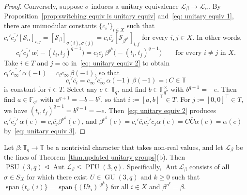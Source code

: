\begin{proof}
Conversely, suppose $\sigma$ induces a unitary equivalence $\mathscr{L}_\beta \to \mathscr{L}_\alpha$.
By Proposition~\ref{prop:switching equiv is unitary equiv} and~\eqref{eq: unitary equiv 1}, there are unimodular constants $\{c_i' \}_{i \in X}$ such that $c_i' \overline{c_j'} [ \mathcal{S}_{\alpha} ]_{i,j} = [ \mathcal{S}_{\beta} ]_{\sigma(i), \sigma(j)} = c_i \overline{c_j} [ \mathcal{S}_{\beta^{p^k}} ]_{i,j}$ for every $i,j \in X$.
In other words,
\begin{equation}
\label{eq: unitary equiv 2}
c_i' \overline{c_j'} \, \alpha \bigl( - (t_i,t_j)^{q-1} \bigr) = c_i \overline{c_j} \, \beta^{p^k}\bigl( - (t_i, t_j)^{q-1} \bigr)
\qquad
\text{for every $i \neq j$ in $X$}.
\end{equation}
Take $i \in T$ and $j = \infty$ in~\eqref{eq: unitary equiv 2} to obtain $c_i' \overline{ c_\infty' }\, \alpha(-1) = c_i \overline{c_\infty}\, \beta(-1)$, so that
\begin{equation}
\label{eq: unitary equiv 3}
c_i' \overline{c_i} = c_{\infty}' \overline{ c_\infty } \, \alpha(-1)\, \beta(-1) =: C \in \mathbb{T}
\end{equation}
is constant for $i \in T$.
Select any $e \in \mathbb{T}_q$, and find $b \in \mathbb{F}_{q^2}^\times$ with $b^{q-1} = -e$.
Then find $a \in \mathbb{F}_{q^2}$ with $a^{q+1} = -b-b^q$, so that $i:=[a,b]^\top \in T$.
For $j := [0,0]^\top \in T$, we have $(t_i,t_j)^{q-1} = b^{q-1} = -e$.
Then~\eqref{eq: unitary equiv 2} produces $c_i' \overline{c_j'} \, \alpha(e) = c_i \overline{c_j} \beta^{p^k}(e)$, and $\beta^{p^k}(e) = c_i' \overline{c_i} \overline{c_j'} c_j \alpha(e) = C \overline{C} \alpha(e) = \alpha(e)$ by~\eqref{eq: unitary equiv 3}.
\end{proof}

\begin{theorem}
\label{thm:unitary automorphisms}
Let $\beta \colon \mathbb{T}_q \to \mathbb{T}$ be a nontrivial character that takes non-real values, and let $\mathscr{L}_\beta$ be the lines of Theorem~\ref{thm.updated unitary groups}(b).
Then
$
\operatorname{PSU}(3,q) \trianglelefteq \operatorname{Aut} \mathscr{L}_\beta \leq \operatorname{P\text{$\Gamma$}U}(3,q).
$
Specifically, $\operatorname{Aut} \mathscr{L}_\beta$ consists of all $\sigma \in S_X$ for which there exist $U \in \operatorname{GU}(3,q)$ and $k \geq 0$ such that $\operatorname{span}\{ t_{\sigma}(i) \} = \operatorname{span}\{ (U t_i)^{\circ p^k} \}$ for all $i \in X$ and $\beta^{p^k} = \beta$.
\end{theorem}

